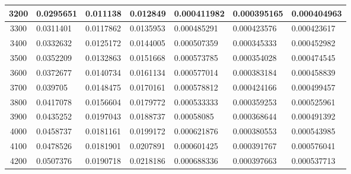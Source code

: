 \documentclass[11pt,spanish]{article} %
\begin{document}
\begin{center}
\begin{longtable}{|c|l|l|l|l|l|l|}
3200 & 0.0295651                    & 0.011138                       & 0.012849                       & 0.000411982                    & 0.000395165                    & 0.000404963                   \\ \hline
3300 & 0.0311401                    & 0.0117862                      & 0.0135953                      & 0.000485291                    & 0.000423576                    & 0.000423617                   \\ \hline
3400 & 0.0332632                    & 0.0125172                      & 0.0144005                      & 0.000507359                    & 0.000345333                    & 0.000452982                   \\ \hline
3500 & 0.0352209                    & 0.0132863                      & 0.0151668                      & 0.000573785                    & 0.000354028                    & 0.000474545                   \\ \hline
3600 & 0.0372677                    & 0.0140734                      & 0.0161134                      & 0.000577014                    & 0.000383184                    & 0.000458839                   \\ \hline
3700 & 0.039705                     & 0.0148475                      & 0.0170161                      & 0.000578812                    & 0.000424166                    & 0.000499457                   \\ \hline
3800 & 0.0417078                    & 0.0156604                      & 0.0179772                      & 0.000533333                    & 0.000359253                    & 0.000525961                   \\ \hline
3900 & 0.0435252                    & 0.0197043                      & 0.0188737                      & 0.00058085                     & 0.000368644                    & 0.000491392                   \\ \hline
4000 & 0.0458737                    & 0.0181161                      & 0.0199172                      & 0.000621876                    & 0.000380553                    & 0.000543985                   \\ \hline
4100 & 0.0478526                    & 0.0181901                      & 0.0207891                      & 0.000601425                    & 0.000391767                    & 0.000576041                   \\ \hline
4200 & 0.0507376                    & 0.0190718                      & 0.0218186                      & 0.000688336                    & 0.000397663                    & 0.000537713                   \\ \hline

\end{longtable}
\end{center}
\end{document}
